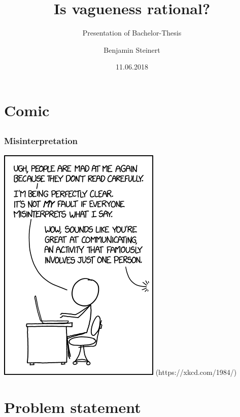 \documentclass[8pt]{beamer}
\title{Is vagueness rational?}
\subtitle{Presentation of Bachelor-Thesis}
\author{Benjamin Steinert}
\institute[Eberhard Karls Universität Tübingen]{%
  Philosophische Fakultät\\
  Seminar für Sprachwissenschaft}
\date{11.06.2018}
\begin{document}
\frame{\titlepage}%

\section{Comic} 
\subsection*{}%
\begin{frame}
\frametitle{Misinterpretation}
\vskip5mm
\hskip2cm
\includegraphics[scale=0.45]{bilder/misinterpretation.png}
(https://xkcd.com/1984/)
\end{frame}

\section{Problem statement} 
\end{document}
